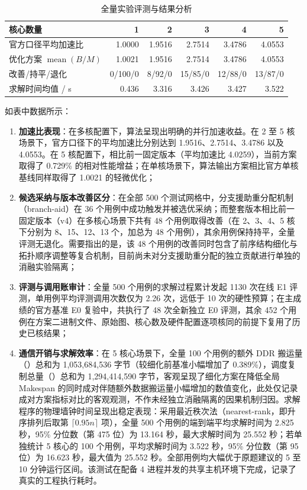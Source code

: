 \documentclass[anonymous,notoc]{gmcm2026}
\providecommand{\tightlist}{\setlength{\itemsep}{0pt}\setlength{\parskip}{0pt}}
\begin{document}
\begin{table}[!htbp]\centering
\caption{全量实验评测与结果分析}\label{tab:04-p1-1}\small

\begin{tabularx}{\linewidth}{@{}Xrrrrr@{}}\toprule
核心数量 & 1 & 2 & 3 & 4 & 5 \\
\midrule
官方口径平均加速比 & 1.0000 & 1.9516 & 2.7514 & 3.4786 & 4.0553 \\
优化方案 $\operatorname{mean}(B/M)$ & 1.0021 & 1.9516 & 2.7514 & 3.4786 & 4.0553 \\
改善/持平/退化 & 0/100/0 & 8/92/0 & 15/85/0 & 12/88/0 & 13/87/0 \\
求解时间均值 / s & 0.436 & 3.316 & 3.426 & 3.427 & 3.522 \\
\bottomrule\end{tabularx}\end{table}

如表中数据所示：

\begin{enumerate}
\def\labelenumi{\arabic{enumi}.}
\tightlist
\item
  \textbf{加速比表现}：在多核配置下，算法呈现出明确的并行加速收益。在 2 至 5 核场景下，官方口径下的平均加速比分别达到 1.9516、2.7514、3.4786 以及 4.0553。在 5 核配置下，相比前一固定版本（平均加速比 4.0259），当前方案取得了 0.729\% 的相对性能增益；在单核场景下，算法输出方案相比官方单核基线同样取得了 1.0021 的轻微优化；
\item
  \textbf{候选采纳与版本改善区分}：在全部 500 个测试网格中，分支援助重分配机制（branch-aid）在 36 个用例中成功触发并被选优采纳；而整套版本相比前一固定版本（v4）在多核心场景下共有 48 个用例取得改善（在 2、3、4、5 核下分别为 8、15、12、13 个，加总为 48 个用例），其余用例保持持平，全量评测无退化。需要指出的是，该 48 个用例的改善同时包含了前序结构细化与拓扑顺序调整等复合机制，目前尚未对分支援助重分配的独立贡献进行单独的消融实验隔离；
\item
  \textbf{评测与调用账审计}：全量 500 个用例的求解过程累计发起 1130 次在线 E1 评测，单用例平均评测调用次数仅为 2.26 次，远低于 10 次的硬性预算；在主成绩的官方基准 E0 复验中，共执行了 48 次全新独立 E0 评测，其余 452 个用例在方案二进制文件、原始图、核心数及硬件配置逐项核同的前提下复用了历史已核结果；
\item
  \textbf{通信开销与求解效率}：在 5 核心场景下，全量 100 个用例的额外 DDR 搬运量（\texttt{}）总和为 1,053,684,536 字节（较细化前基准小幅增加了 0.389\%），调度复制总量（\texttt{}）总和为 1,294,414,590 字节，客观呈现了细化方案在降低全局 Makespan 的同时成对伴随额外数据搬运量小幅增加的数值变化，此处仅记录成对方案指标对比的客观观测，不作未经独立消融隔离的因果机制归因。求解程序的物理墙钟时间呈现出稳定表现：采用最近秩次法（nearest-rank，即升序排列后取第 \(\lceil 0.95n \rceil\) 项），全量 500 个用例的端到端平均求解时间为 2.825 秒，95\% 分位数（第 475 位）为 13.164 秒，最大求解时间为 25.552 秒；若单独统计 5 核心的 100 个用例，平均求解时间为 3.522 秒，95\% 分位数（第 95 位）为 16.623 秒，最大值为 25.552 秒。全部用例均大幅优于原题建议的 5 至 10 分钟运行区间。该测试在配备 4 进程并发的共享主机环境下完成，记录了真实的工程执行耗时。
\end{enumerate}
\end{document}
